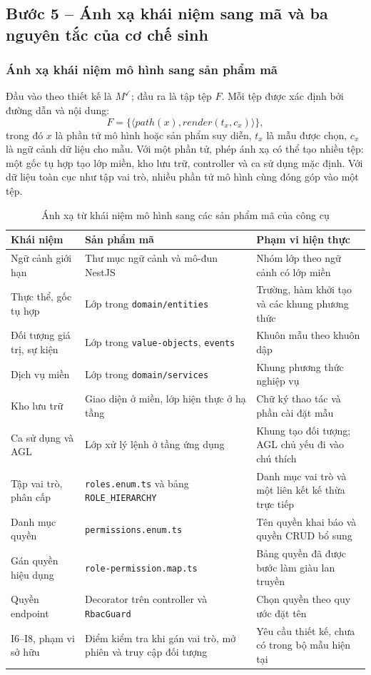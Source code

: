 \subsection{Bước 5 -- Ánh xạ khái niệm sang mã và ba nguyên tắc của cơ chế sinh}
\label{sec:buoc5}

\subsubsection{Ánh xạ khái niệm mô hình sang sản phẩm mã}

Đầu vào theo thiết kế là $M^{\checkmark}$; đầu ra là tập tệp $F$. Mỗi tệp được xác định bởi đường dẫn và nội dung:
\[
F=\{\langle\mathit{path}(x),\mathit{render}(t_x,c_x)\rangle\},
\]
trong đó $x$ là phần tử mô hình hoặc sản phẩm suy diễn, $t_x$ là mẫu được chọn, $c_x$ là ngữ cảnh dữ liệu cho mẫu. Với một phần tử, phép ánh xạ có thể tạo nhiều tệp: một gốc tụ hợp tạo lớp miền, kho lưu trữ, controller và ca sử dụng mặc định. Với dữ liệu toàn cục như tập vai trò, nhiều phần tử mô hình cùng đóng góp vào một tệp.

\begin{table}[htbp]
\centering
\caption{Ánh xạ từ khái niệm mô hình sang các sản phẩm mã của công cụ}
\label{tab:anh-xa-sinh-ma}
\small
\begin{tabularx}{\textwidth}{@{}p{3.1cm}XX@{}}
\toprule
\textbf{Khái niệm} & \textbf{Sản phẩm mã} & \textbf{Phạm vi hiện thực} \\
\midrule
Ngữ cảnh giới hạn & Thư mục ngữ cảnh và mô-đun NestJS & Nhóm lớp theo ngữ cảnh có lớp miền \\
Thực thể, gốc tụ hợp & Lớp trong \texttt{domain/entities} & Trường, hàm khởi tạo và các khung phương thức \\
Đối tượng giá trị, sự kiện & Lớp trong \texttt{value-objects}, \texttt{events} & Khuôn mẫu theo khuôn dập \\
Dịch vụ miền & Lớp trong \texttt{domain/services} & Khung phương thức nghiệp vụ \\
Kho lưu trữ & Giao diện ở miền, lớp hiện thực ở hạ tầng & Chữ ký thao tác và phần cài đặt mẫu \\
Ca sử dụng và AGL & Lớp xử lý lệnh ở tầng ứng dụng & Khung tạo đối tượng; AGL chủ yếu đi vào chú thích \\
Tập vai trò, phân cấp & \texttt{roles.enum.ts} và bảng \texttt{ROLE\_HIERARCHY} & Danh mục vai trò và một liên kết kế thừa trực tiếp \\
Danh mục quyền & \texttt{permissions.enum.ts} & Tên quyền khai báo và quyền CRUD bổ sung \\
Gán quyền hiệu dụng & \texttt{role-permission.map.ts} & Bảng quyền đã được bước làm giàu lan truyền \\
Quyền endpoint & Decorator trên controller và \texttt{RbacGuard} & Chọn quyền theo quy ước đặt tên \\
I6--I8, phạm vi sở hữu & Điểm kiểm tra khi gán vai trò, mở phiên và truy cập đối tượng & Yêu cầu thiết kế, chưa có trong bộ mẫu hiện tại \\
\bottomrule
\end{tabularx}
\end{table}

